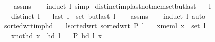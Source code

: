 \begin{isabellebody}
%
\isadelimproof
\ \ %
\endisadelimproof
%
\isatagproof
{}\isamarkupfalse%
\ assms\isanewline
\ \ \isamarkupfalse%
\ {\isacharparenleft}{\kern0pt}induct\ l{\isacharparenright}{\kern0pt}\ simp{\isacharplus}{\kern0pt}%
\endisatagproof
{\isafoldproof}%
%
\isadelimproof
\isanewline
%
\endisadelimproof
\isanewline
{}\isamarkupfalse%
\ distinct{\isacharunderscore}{\kern0pt}imp{\isacharunderscore}{\kern0pt}last{\isacharunderscore}{\kern0pt}not{\isacharunderscore}{\kern0pt}mem{\isacharunderscore}{\kern0pt}set{\isacharunderscore}{\kern0pt}butlast{\isacharcolon}{\kern0pt}\isanewline
\ \ \ {\isachardoublequoteopen}l\ {\isasymnoteq}\ {\isacharbrackleft}{\kern0pt}{\isacharbrackright}{\kern0pt}{\isachardoublequoteclose}\isanewline
\ \ \ {\isachardoublequoteopen}distinct\ l{\isachardoublequoteclose}\isanewline
\ \ \ {\isachardoublequoteopen}last\ l\ {\isasymnotin}\ set\ {\isacharparenleft}{\kern0pt}butlast\ l{\isacharparenright}{\kern0pt}{\isachardoublequoteclose}\isanewline
%
\isadelimproof
\ \ %
\endisadelimproof
%
\isatagproof
{}\isamarkupfalse%
\ assms\isanewline
\ \ \isamarkupfalse%
\ {\isacharparenleft}{\kern0pt}induct\ l{\isacharparenright}{\kern0pt}\ auto%
\endisatagproof
{\isafoldproof}%
%
\isadelimproof
%
\endisadelimproof
%
\isadelimdocument
%
\endisadelimdocument
%
\isatagdocument
%
\isamarkuptrue%
%
\endisatagdocument
{\isafolddocument}%
%
\isadelimdocument
%
\endisadelimdocument
{}\isamarkupfalse%
\ sorted{\isacharunderscore}{\kern0pt}wrt{\isacharunderscore}{\kern0pt}imp{\isacharunderscore}{\kern0pt}hd{\isacharcolon}{\kern0pt}\isanewline
\ \ \ l{\isacharunderscore}{\kern0pt}sorted{\isacharunderscore}{\kern0pt}wrt{\isacharcolon}{\kern0pt}\ {\isachardoublequoteopen}sorted{\isacharunderscore}{\kern0pt}wrt\ P\ l{\isachardoublequoteclose}\isanewline
\ \ \ x{\isacharunderscore}{\kern0pt}mem{\isacharunderscore}{\kern0pt}l{\isacharcolon}{\kern0pt}\ {\isachardoublequoteopen}x\ {\isasymin}\ set\ l{\isachardoublequoteclose}\isanewline
\ \ \ x{\isacharunderscore}{\kern0pt}not{\isacharunderscore}{\kern0pt}hd{\isacharcolon}{\kern0pt}\ {\isachardoublequoteopen}x\ {\isasymnoteq}\ hd\ l{\isachardoublequoteclose}\isanewline
\ \ \ {\isachardoublequoteopen}P\ {\isacharparenleft}{\kern0pt}hd\ l{\isacharparenright}{\kern0pt}\ x{\isachardoublequoteclose}\isanewline
%
\isadelimproof
%

\end{isabellebody}
